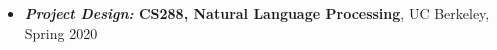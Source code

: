\begin{itemize}[leftmargin=-0.4mm,partopsep=0pt,label=]
\item \textbf{\emph{Project Design:} CS288, Natural Language Processing}, UC Berkeley, Spring 2020
\end{itemize}






